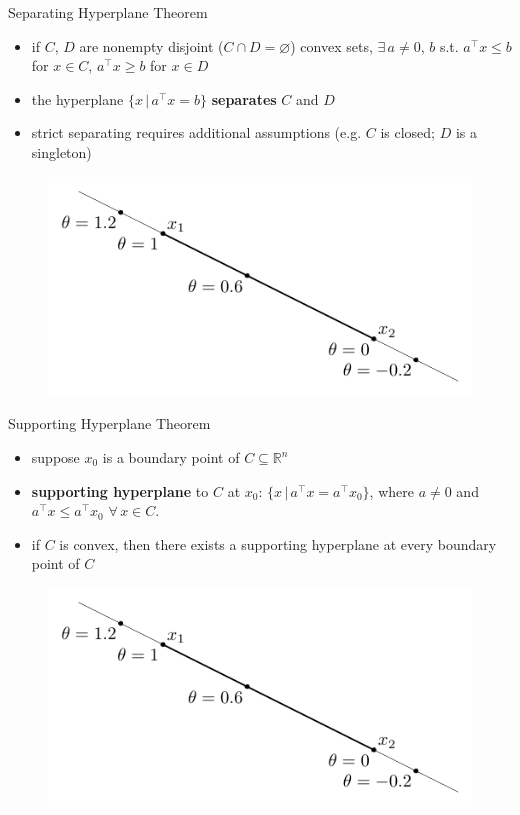 \documentclass[10pt]{beamer}
\newcommand{\ds}{\displaystyle}
\theoremstyle{definition}
\begin{document}
\begin{frame}{Separating Hyperplane Theorem}
  \begin{itemize}
    \item if $C$, $D$ are nonempty disjoint ($C\cap D=\varnothing$) convex sets, $\exists\,a\ne 0$, $b$ s.t. $\ds a^\top x\leqslant b$ for $x\in C$, $a^\top x\geqslant b$ for $x\in D$ 
    \item the hyperplane $\ds\{x\,|\,a^\top x = b\}$ {\bf separates} $C$ and $D$
    \item strict separating requires additional assumptions (e.g. $C$ is closed; $D$ is a singleton)
  \end{itemize}
  \begin{figure}[!htbp]
    \centering
    \includegraphics[scale=0.91,page=18]{fig/note06/02.pdf}
  \end{figure}
\end{frame}

\begin{frame}{Supporting Hyperplane Theorem}
  \begin{itemize}
    \item suppose $x_0$ is a boundary point of $C\subseteq\mathbb{R}^n$
    \item {\bf supporting hyperplane} to $C$ at $x_0$: $\{x\,|\,a^\top x = a^\top x_0\}$, where $a\ne 0$ and $a^\top x\leqslant a^\top x_0$ $\forall\,x\in C$. 
    \item if $C$ is convex, then there exists a supporting hyperplane at every boundary point of $C$ 
  \end{itemize}
  \begin{figure}[!htbp]
    \centering
    \includegraphics[scale=0.91,page=21]{fig/note06/02.pdf}
  \end{figure}
\end{frame}
\end{document}
